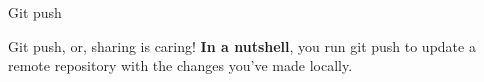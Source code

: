 \begin{frame}{Git push}
    \begin{block}{Git push, or, sharing is caring!}
    \textbf{In a nutshell}, you run git push to update a remote repository with the changes you've made locally. 
    
    \end{block}
\end{frame}
